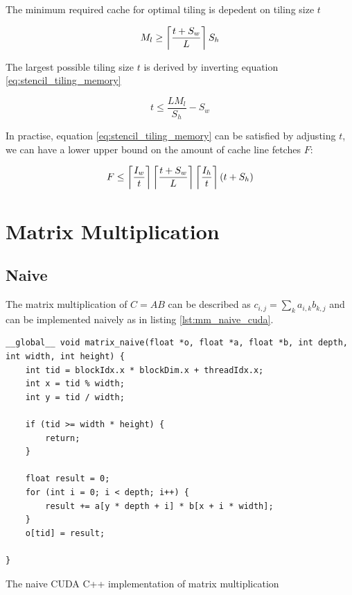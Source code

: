 The minimum required cache for optimal tiling is depedent on \TODO{\dots} tiling size $t$

\begin{equation}
    M_l \geq \left\lceil \frac{t + S_w}{L} \right\rceil S_h \label{eq:stencil_tiling_memory}
\end{equation}

The largest possible tiling size $t$ is derived by inverting equation \ref{eq:stencil_tiling_memory}

\begin{equation}
    t \leq \frac{L M_l}{S_h} - S_w
\end{equation}

In practise, equation \ref{eq:stencil_tiling_memory} can be satisfied by adjusting $t$, we can have a lower upper bound on the amount of cache line fetches $F$:

\begin{equation}
    F \leq \left\lceil \frac{I_w}{t} \right\rceil \left\lceil \frac{t + S_w}{L} \right\rceil \left\lceil \frac{I_h}{t} \right\rceil (t + S_h)
    \label{eq:stencil_tiling_fetches}
\end{equation}



\section{Matrix Multiplication}

\subsection{Naive}
\label{sec:matrix_naive}
The matrix multiplication of $C = AB$ can be described as $c_{i,j} = \sum_{k}a_{i,k}b_{k,j}$ and can be implemented naively as in listing \ref{lst:mm_naive_cuda}.

\begin{listing}[H]
    \begin{verbatim}
__global__ void matrix_naive(float *o, float *a, float *b, int depth, int width, int height) {
    int tid = blockIdx.x * blockDim.x + threadIdx.x;
    int x = tid % width;
    int y = tid / width;
    
    if (tid >= width * height) {
        return;
    }

    float result = 0;
    for (int i = 0; i < depth; i++) {
        result += a[y * depth + i] * b[x + i * width];
    }
    o[tid] = result;
    
}
    \end{verbatim}
    \caption{
        The naive CUDA C++ implementation of matrix multiplication
    }
    \label{lst:mm_naive_cuda}
\end{listing}

